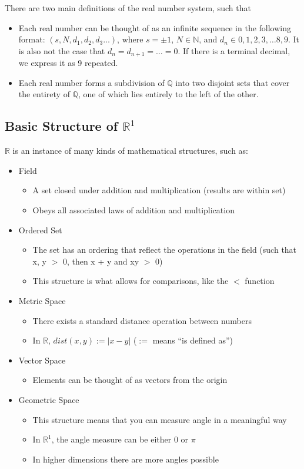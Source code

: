 \documentclass[11 pt, twoside]{article}
\begin{document}
There are two main definitions of the real number system, such that
\begin{itemize}
\item Each real number can be thought of as an infinite sequence in the
following format: $(s, N, d_1, d_2, d_3 \dots)$, where $s = \pm 1$, $N \in \mathbb{N}$, and $d_n \in {0, 1, 2, 3,
\dots 8, 9}$. It is also not the case that $d_n = d_{n+1} = \dots = 0$.
If there is a terminal decimal, we express it as 9 repeated.
\item Each real number forms a subdivision of $\mathbb{Q}$ into two
disjoint sets that cover the entirety of $\mathbb{Q}$, one of which
lies entirely to the left of the other.
\end{itemize}

\subsection{Basic Structure of $\mathbb{R}^1$}
$\mathbb{R}$ is an instance of many kinds of mathematical structures, such as:
\begin{itemize}
\item Field
\begin{itemize}
\item A set closed under addition and multiplication (results are within set)
\item Obeys all associated laws of addition and multiplication
\end{itemize}
\item Ordered Set
\begin{itemize}
\item The set has an ordering that reflect the operations in the
field (such that x, y $>$ 0, then x + y and xy $>$ 0)
\item This structure is what allows for comparisons, like the $<$
function
\end{itemize}
\item Metric Space
\begin{itemize}
\item There exists a standard distance operation between numbers
\item In $\mathbb{R}$, $dist(x, y) := |x - y|$ ($:=$ means ``is
defined as'')
\end{itemize}
\item Vector Space
\begin{itemize}
\item Elements can be thought of as vectors from the origin
\end{itemize}
\item Geometric Space
\begin{itemize}
\item This structure means that you can measure angle in a meaningful way
\item In $\mathbb{R}^1$, the angle measure can be either $0$ or $\pi$
\item In higher dimensions there are more angles possible
\end{itemize}
\end{itemize}
\end{document}
